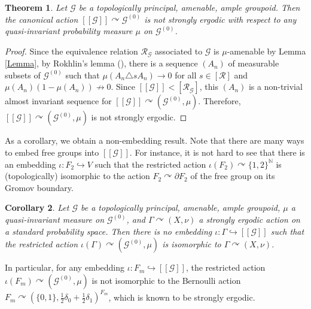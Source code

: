 \documentclass{amsart}
\newcommand{\G}{\mathcal{G}}
\newcommand{\R}{\mathcal{R}}
\newtheorem{theorem}{Theorem}[section]
\newtheorem{corollary}[theorem]{Corollary}
\theoremstyle{remark}
\theoremstyle{definition}
\begin{document}
\begin{theorem}\label{main}
Let $\G$ be a topologically principal, amenable, ample groupoid.
Then the canonical action $[[ \G ]] \curvearrowright \G^{(0)}$ is not strongly ergodic with respect to any quasi-invariant probability measure $\mu$ on $\G^{(0)}$.
\end{theorem}

\begin{proof}
Since the equivalence relation $\R_\G$ associated to $\G$ is $\mu$-amenable by Lemma \ref{Lemma}, by Rokhlin's lemma (\cite[Proposition 2.2]{Schmidt}), there is a sequence $(A_n)$ of measurable subsets of $\mathcal{G}^{(0)}$ such that $\mu (A_n \triangle s A_n) \to 0$ for all $s \in [\R]$ and $\mu (A_n) (1-\mu (A_n)) \not\to 0$.
Since $[[ \G ]] < [ \R_\G ]$, this $(A_n)$ is a non-trivial almost invariant sequence for $[[ \G ]] \curvearrowright (\G^{(0)}, \mu)$.
Therefore, $[[ \G ]] \curvearrowright (\G^{(0)}, \mu)$ is not strongly ergodic.

\end{proof}

As a corollary, we obtain a non-embedding result.
Note that there are many ways to embed free groups into $[[ \G ]]$.
For instance, it is not hard to see that there is an embedding $\iota \colon F_2 \hookrightarrow V$ such that the restricted action $\iota (F_2) \curvearrowright \{ 1, 2 \} ^{\mathbb{N}}$ is (topologically) isomorphic to the action $F_2 \curvearrowright \partial F_2$ of the free group on its Gromov boundary.

\begin{corollary}
Let $\G$ be a topologically principal, amenable, ample groupoid, $\mu$ a quasi-invariant measure on $\G^{(0)}$, and $\Gamma \curvearrowright (X, \nu)$ a strongly ergodic action on a standard probability space.
Then there is no embedding $\iota \colon \Gamma \hookrightarrow [[ \G ]]$ such that the restricted action $\iota (\Gamma) \curvearrowright (\G^{(0)}, \mu )$ is isomorphic to $\Gamma \curvearrowright (X, \nu)$.
\end{corollary}

In particular, for any embedding $\iota \colon F_m \hookrightarrow [[ \G ]]$, the restricted action $\iota (F_m) \curvearrowright (\G^{(0)}, \mu)$ is not isomorphic to the Bernoulli action $F_m \curvearrowright (\{ 0, 1 \} , \frac{1}{2}\delta _0 + \frac{1}{2}\delta _1)^{F_m}$, which is known to be strongly ergodic. 
\end{document}
